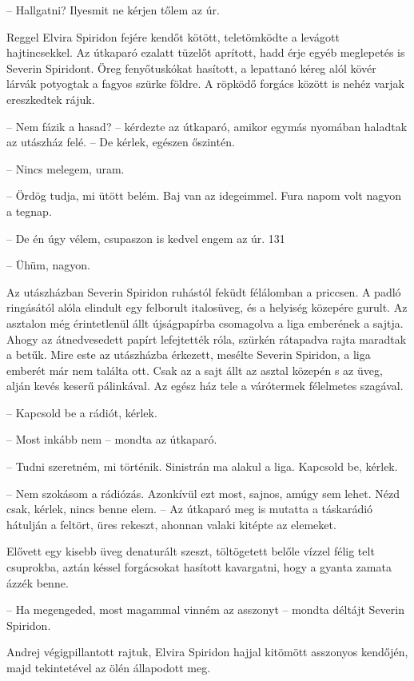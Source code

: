 \documentclass{IEEEtran}
\begin{document}
– Hallgatni? Ilyesmit ne kérjen tőlem az úr.

Reggel Elvira Spiridon fejére kendőt kötött, teletömködte a levágott
hajtincsekkel. Az útkaparó ezalatt tüzelőt aprított, hadd érje egyéb
meglepetés is Severin Spiridont. Öreg fenyőtuskókat hasított, a lepattanó
kéreg alól kövér lárvák potyogtak a fagyos szürke földre. A röpködő forgács
között is nehéz varjak ereszkedtek rájuk.

– Nem fázik a hasad? – kérdezte az útkaparó, amikor egymás nyomában haladtak
az utászház felé. – De kérlek, egészen őszintén.

– Nincs melegem, uram.

– Ördög tudja, mi ütött belém. Baj van az idegeimmel. Fura napom volt nagyon a
tegnap.

– De én úgy vélem, csupaszon is kedvel engem az úr.
131

– Ühüm, nagyon.

Az utászházban Severin Spiridon ruhástól feküdt félálomban a priccsen. A padló
ringásától alóla elindult egy felborult italosüveg, és a helyiség közepére
gurult. Az asztalon még érintetlenül állt újságpapírba csomagolva a liga
emberének a sajtja. Ahogy az átnedvesedett papírt lefejtették róla, szürkén
rátapadva rajta maradtak a betűk. Mire este az utászházba érkezett, mesélte
Severin Spiridon, a liga emberét már nem találta ott. Csak az a sajt állt az
asztal közepén s az üveg, alján kevés keserű pálinkával. Az egész ház tele a
várótermek félelmetes szagával.

– Kapcsold be a rádiót, kérlek.

– Most inkább nem – mondta az útkaparó.

– Tudni szeretném, mi történik. Sinistrán ma alakul a liga. Kapcsold be,
kérlek.

– Nem szokásom a rádiózás. Azonkívül ezt most, sajnos, amúgy sem lehet. Nézd
csak, kérlek, nincs benne elem. – Az útkaparó meg is mutatta a táskarádió
hátulján a feltört, üres rekeszt, ahonnan valaki kitépte az elemeket.

Elővett egy kisebb üveg denaturált szeszt, töltögetett belőle vízzel félig
telt csuprokba, aztán késsel forgácsokat hasított kavargatni, hogy a gyanta
zamata ázzék benne.

– Ha megengeded, most magammal vinném az asszonyt – mondta déltájt Severin
Spiridon.

Andrej végigpillantott rajtuk, Elvira Spiridon hajjal kitömött asszonyos
kendőjén, majd tekintetével az ölén állapodott meg.
\end{document}
